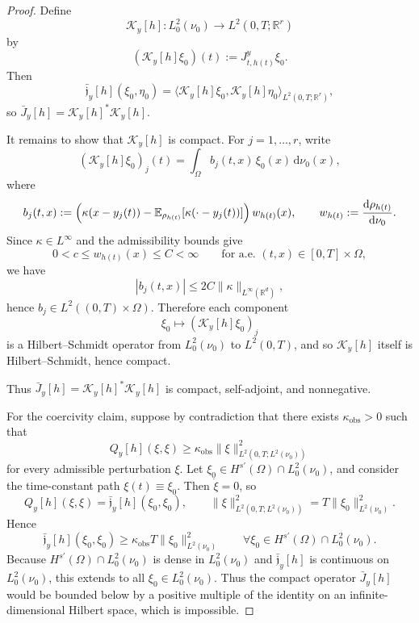 \documentclass{article}
\theoremstyle{definition}
\renewcommand{\d}{\mathrm{d}}
\begin{document}
\begin{proof}
    Define
    \[
        \mathcal K_y[h]:L^2_0(\nu_0)\to L^2(0,T;\mathbb R^r)
    \]
    by
    \[
        (\mathcal K_y[h]\xi_0)(t)
        :=
        J_{t,h(t)}^{y}\xi_0.
    \]
    Then
    \[
        \bar{\mathfrak j}_y[h](\xi_0,\eta_0)
        =
        \langle \mathcal K_y[h]\xi_0,\mathcal K_y[h]\eta_0\rangle_{L^2(0,T;\mathbb R^r)},
    \]
    so \(\bar J_y[h]=\mathcal K_y[h]^\ast \mathcal K_y[h]\).

    It remains to show that \(\mathcal K_y[h]\) is compact. For \(j=1,\dots,r\), write
    \[
        (\mathcal K_y[h]\xi_0)_j(t)
        =
        \int_\Omega b_j(t,x)\,\xi_0(x)\,\d\nu_0(x),
    \]
    where
    \[
        b_j(t,x)
        :=
        \Bigl(
        \kappa(x-y_j(t))
        -
        \mathbb E_{\rho_{h(t)}}[\kappa(\cdot-y_j(t))]
        \Bigr)
        \,w_{h(t)}(x),
        \qquad
        w_{h(t)}:=\frac{\d\rho_{h(t)}}{\d\nu_0}.
    \]
    Since \(\kappa\in L^\infty\) and the admissibility bounds give
    \[
        0<c\le w_{h(t)}(x)\le C<\infty
        \qquad\text{for a.e.\ }(t,x)\in[0,T]\times\Omega,
    \]
    we have
    \[
        |b_j(t,x)|\le 2C\|\kappa\|_{L^\infty(\mathbb R^d)},
    \]
    hence \(b_j\in L^2((0,T)\times\Omega)\). Therefore each component
    \[
        \xi_0\longmapsto (\mathcal K_y[h]\xi_0)_j
    \]
    is a Hilbert--Schmidt operator from \(L^2_0(\nu_0)\) to \(L^2(0,T)\), and so
    \(\mathcal K_y[h]\) itself is Hilbert--Schmidt, hence compact.

    Thus \(\bar J_y[h]=\mathcal K_y[h]^\ast\mathcal K_y[h]\) is compact, self-adjoint, and
    nonnegative.

    For the coercivity claim, suppose by contradiction that there exists
    \(\kappa_{\mathrm{obs}}>0\) such that
    \[
        Q_y[h](\xi,\xi)
        \ge
        \kappa_{\mathrm{obs}}
        \|\xi\|_{L^2(0,T;L^2(\nu_0))}^2
    \]
    for every admissible perturbation \(\xi\). Let \(\xi_0\in H^{s'}(\Omega)\cap L^2_0(\nu_0)\), and
    consider the time-constant path \(\xi(t)\equiv\xi_0\). Then \(\dot\xi=0\), so
    \[
        Q_y[h](\xi,\xi)
        =
        \bar{\mathfrak j}_y[h](\xi_0,\xi_0),
        \qquad
        \|\xi\|_{L^2(0,T;L^2(\nu_0))}^2
        =
        T\|\xi_0\|_{L^2(\nu_0)}^2.
    \]
    Hence
    \[
        \bar{\mathfrak j}_y[h](\xi_0,\xi_0)
        \ge
        \kappa_{\mathrm{obs}}T\|\xi_0\|_{L^2(\nu_0)}^2
        \qquad
        \forall \xi_0\in H^{s'}(\Omega)\cap L^2_0(\nu_0).
    \]
    Because \(H^{s'}(\Omega)\cap L^2_0(\nu_0)\) is dense in \(L^2_0(\nu_0)\) and
    \(\bar{\mathfrak j}_y[h]\) is continuous on \(L^2_0(\nu_0)\), this extends to all
    \(\xi_0\in L^2_0(\nu_0)\). Thus the compact operator \(\bar J_y[h]\) would be bounded below by a
    positive multiple of the identity on an infinite-dimensional Hilbert space, which is impossible.
\end{proof}
\end{document}
